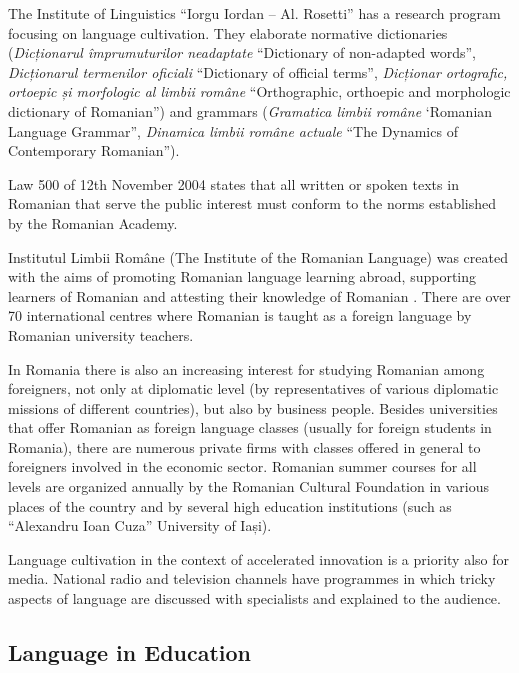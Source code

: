 \documentclass[]{../../metanetpaper}
\begin{document}
\begin{multicols}{2}
The Institute of Linguistics “Iorgu Iordan – Al. Rosetti” has a research program focusing on language cultivation. They elaborate normative dictionaries (\textit{Dicționarul împrumuturilor neadaptate} “Dictionary of non-adapted words”, \textit{Dicționarul termenilor oficiali} “Dictionary of official terms”, \textit{Dicționar ortografic, ortoepic și morfologic al limbii române} “Orthographic, orthoepic and morphologic dictionary of Romanian”) and grammars (\textit{Gramatica limbii române} ‘Romanian Language Grammar”, \textit{Dinamica limbii române actuale} “The Dynamics of Contemporary Romanian”).

Law 500 of 12th November 2004 states that all written or spoken texts in Romanian that serve the public interest must conform to the norms established by the Romanian Academy.


Institutul Limbii Române (The Institute of the Romanian Language) was created with the aims of promoting Romanian language learning abroad, supporting learners of Romanian and attesting their knowledge of Romanian \cite{urlILR}. There are over 70 international centres where Romanian is taught as a foreign language by Romanian university teachers.

In Romania there is also an increasing interest for studying Romanian among foreigners, not only at diplomatic level (by representatives of various diplomatic missions of different countries), but also by business people. Besides universities that offer Romanian as foreign language classes (usually for foreign students in Romania), there are numerous private firms with classes offered in general to foreigners involved in the economic sector. Romanian summer courses for all levels are organized annually by the Romanian Cultural Foundation in various places of the country and by several high education institutions (such as “Alexandru Ioan Cuza” University of Iași).

Language cultivation in the context of accelerated innovation is a priority also for media. National radio and television channels have programmes in which tricky aspects of language are discussed with specialists and explained to the audience.

\subsection{Language in Education}


\end{multicols}
\end{document}
